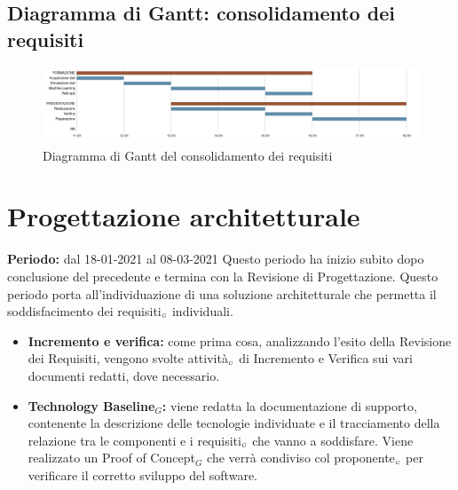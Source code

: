 \subsection{Diagramma di Gantt: consolidamento dei requisiti}\label{PianificazioneDiagrammaDiGanttConsolidamento}
\begin{figure}[!h]
	\begin{center}
		\includegraphics[width=1\linewidth]{../immagini/pdp/gantt_consolidamento_requisiti.png}
		\caption{Diagramma di Gantt del consolidamento dei requisiti}
	\end{center}
\end{figure}
\section{Progettazione architetturale}\label{PianificazioneProgettazioneArchitetturale}
\textbf{Periodo:} dal 18-01-2021 al 08-03-2021
Questo periodo ha inizio subito dopo conclusione del precedente e termina con la Revisione di Progettazione.
Questo periodo porta all'individuazione di una soluzione architetturale che permetta il soddisfacimento dei requisiti$_{\scaleto{G}{3pt}}$ individuali.
\begin{itemize}
	\item \textbf{Incremento e verifica:} come prima cosa, analizzando l'esito della Revisione dei Requisiti, vengono svolte attività$_{\scaleto{G}{3pt}}$ di Incremento e Verifica sui vari documenti redatti, dove necessario.
	\item \textbf{Technology Baseline$_G$:} viene redatta la documentazione di supporto, contenente la descrizione delle tecnologie individuate e il tracciamento della relazione tra le componenti e i requisiti$_{\scaleto{G}{3pt}}$ che vanno a soddisfare.
	Viene realizzato un Proof of Concept$_G$ che verrà condiviso col proponente$_{\scaleto{G}{3pt}}$ per verificare il corretto sviluppo del software.
\end{itemize}
